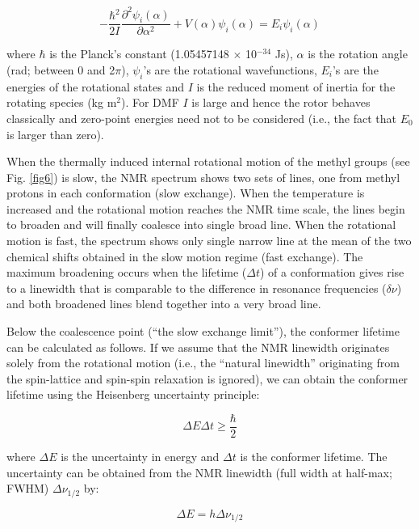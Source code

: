 \documentclass[byrevtex,amssymb,aps,pra,floatfix,letterpaper]{revtex4}
\begin{document}
\begin{equation}
-\frac{\hbar^2}{2I}\frac{\partial^2\psi_i(\alpha)}{\partial\alpha^2} + V(\alpha)\psi_i(\alpha) = E_i\psi_i(\alpha) 
\label{eq8}
\end{equation}

\noindent
where $\hbar$ is the Planck's constant (1.05457148 $\times$ 10$^{-34}$ Js), $\alpha$ is the rotation angle (rad; between 0 and 2$\pi$), $\psi_i$'s are the rotational wavefunctions, $E_i$'s are the energies of the rotational states and $I$ is the reduced moment of inertia for the rotating species (kg m$^2$). For DMF $I$ is large and hence the rotor behaves classically and zero-point energies need not to be considered (i.e., the fact that $E_0$ is larger than zero).

When the thermally induced internal rotational motion of the methyl groups (see Fig. \ref{fig6}) is slow, the NMR spectrum shows two sets of lines, one from methyl protons in each conformation (slow exchange). When the temperature is increased and the rotational motion reaches the NMR time scale, the lines begin to broaden and will finally coalesce into single broad line. When the rotational motion is fast, the spectrum shows only single narrow line at the mean of the two chemical shifts obtained in the slow motion regime (fast exchange). The maximum broadening occurs when the lifetime ($\Delta t$) of a conformation gives rise to a linewidth that is comparable to the difference in resonance frequencies ($\delta\nu$) and both broadened lines blend together into a very broad line.

Below the coalescence point (``the slow exchange limit''), the conformer lifetime can be calculated as follows. If we assume that the NMR linewidth originates solely from the rotational motion (i.e., the ``natural linewidth'' originating from the spin-lattice and spin-spin relaxation is ignored), we can obtain the conformer lifetime using the Heisenberg uncertainty principle:

\begin{equation}
\Delta E\Delta t\ge\frac{\hbar}{2}
\label{eq9}
\end{equation}

\noindent
where $\Delta E$ is the uncertainty in energy and $\Delta t$ is the conformer lifetime. The uncertainty can be obtained from the NMR linewidth (full width at half-max; FWHM) $\Delta\nu_{1/2}$ by:

\begin{equation}
\Delta E = h\Delta\nu_{1/2}
\label{eq10}
\end{equation}
\end{document}
